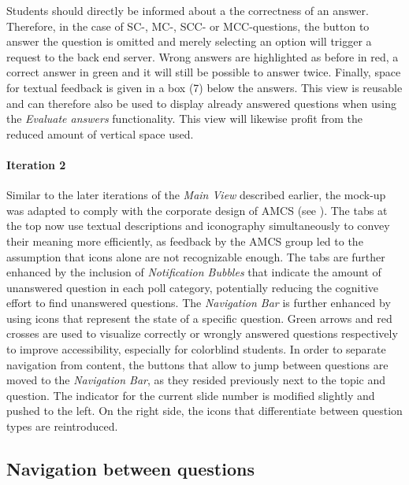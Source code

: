 Students should directly be informed about a the correctness of an answer.
Therefore, in the case of SC-, MC-, SCC- or MCC-questions, the button to answer the question is omitted and merely selecting an option will trigger a request to the back end server.
Wrong answers are highlighted as before in red, a correct answer in green and it will still be possible to answer twice. Finally, space for textual feedback is given in a box (7) below the answers. This view is reusable and can therefore also be used to display already answered questions when using the \emph{Evaluate answers} functionality. This view will likewise profit from the reduced amount of vertical space used. 
\paragraph{Iteration 2}
Similar to the later iterations of the \emph{Main View} described earlier, the mock-up was adapted to comply with the corporate design of AMCS (see ).
The tabs at the top now use textual descriptions and iconography simultaneously to convey their meaning more efficiently, as feedback by the AMCS group led to the assumption that icons alone are not recognizable enough. The tabs are further enhanced by the inclusion of \emph{Notification Bubbles} that indicate the amount of unanswered question in each poll category, potentially reducing the cognitive effort to find unanswered questions.
The \emph{Navigation Bar} is further enhanced by using icons that represent the state of a specific question. Green arrows and red crosses are used to visualize correctly or wrongly answered questions respectively to improve accessibility, especially for colorblind students.
In order to separate navigation from content, the buttons that allow to jump between questions are moved to the \emph{Navigation Bar}, as they resided previously next to the topic and question.
The indicator for the current slide number is modified slightly and pushed to the left. On the right side, the icons that differentiate between question types are reintroduced. 
\subsection{Navigation between questions}

